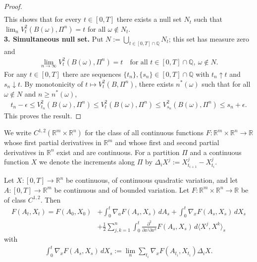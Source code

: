 \begin{proof}
\begin{align*}
	\end{align*}
	This shows that for every $t \in [0, T]$ there exists a null set $N_t$ such that $\lim_n V_t^2(B(\omega), \Pi^n) = t$ for all $\omega \notin N_t$.\\
	\textbf{3. Simultaneous null set.} Put $N := \bigcup_{t \in [0, T] \cap \mathbb{Q}} N_t$; this set has measure zero and
	\begin{align*}
		\lim_{n \rightarrow \infty} V_t^2(B(\omega), \Pi^n) = t \quad \text{for all } t \in [0, T] \cap \mathbb{Q}, \ \omega \notin N.
	\end{align*}
	For any $t \in [0, T]$ there are sequences $\{t_n\}, \{s_n\} \in [0, T] \cap \mathbb{Q}$ with $t_n \uparrow t$ and $s_n \downarrow t$. By monotonicity of $t \mapsto V_t^2(B, \Pi^n)$, there exists $n^*(\omega)$ such that for all $\omega \notin N$ and $n \ge n^*(\omega)$,
	\begin{align*}
		t_n - \epsilon \le V_{t_n}^2(B(\omega), \Pi^n) \le V_t^2(B(\omega), \Pi^n) \le V_{s_n}^2(B(\omega), \Pi^n) \le s_n + \epsilon.
	\end{align*}
	This proves the result.
\end{proof}

We write $C^{1,2}(\mathbb{R}^m \times \mathbb{R}^n)$ for the class of all continuous functions $F : \mathbb{R}^m \times \mathbb{R}^n \rightarrow \mathbb{R}$ whose first partial derivatives in $\mathbb{R}^m$ and whose first and second partial derivatives in $\mathbb{R}^n$ exist and are continuous. For a partition $\Pi$ and a continuous function $X$ we denote the increments along $\Pi$ by $\Delta_i X^j := X^j_{t_{i+1}} - X^j_{t_i}$.

\begin{theorem}
	Let $X : [0, T] \rightarrow \mathbb{R}^n$ be continuous, of continuous quadratic variation, and let $A : [0, T] \rightarrow \mathbb{R}^m$ be continuous and of bounded variation. Let $F : \mathbb{R}^m \times \mathbb{R}^n \rightarrow \mathbb{R}$ be of class $C^{1,2}$. Then
	\begin{align*}
		F(A_t, X_t) = F(A_0, X_0) &+ \int_0^t \nabla_a F(A_s, X_s)\, dA_s + \int_0^t \nabla_x F(A_s, X_s)\, dX_s\\
		&+ \frac{1}{2} \sum_{j, k = 1}^n \int_0^t \frac{\partial^2}{\partial x^j \partial x^k} F(A_s, X_s)\, d\langle X^j, X^k \rangle_s
	\end{align*}
	with
	\begin{align*}
		\int_0^t \nabla_x F(A_s, X_s)\, dX_s := \lim_n \sum_{t_i} \nabla_x F(A_{t_i}, X_{t_i}) \Delta_i X.
	\end{align*}
\end{theorem}

